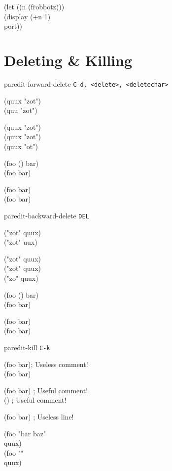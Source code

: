 \documentclass[landscape,a3paper]{article}
\newenvironment{nstabbing}
  {\setlength{\topsep}{-\parskip}%
   \setlength{\partopsep}{0.2em}%
   \tabbing}
  {\endtabbing}
\begin{document}
\begin{multicols}{4}
\begin{nstabbing}
(\=let ((n (f\=robbotz)))\\
\>\cursor (display (+n 1)\\
\>\>
port))
\end{nstabbing}
\rmfamily

    \section*{Deleting \& Killing}

paredit-forward-delete \texttt{C-d, <delete>, <deletechar>}

\ttfamily
(quu\cursor{}x "zot")\\
(quu\cursor{} "zot")

(quux \cursor"zot")\\
(quux "\cursor zot")\\
(quux "\cursor ot")

(foo (\cursor) bar)\\
(foo \cursor{} bar)

\cursor(foo bar)\\
(\cursor foo bar)
\rmfamily

paredit-backward-delete \texttt{DEL}

\ttfamily
("zot" q\cursor uux)\\
("zot" \cursor uux)

("zot"\cursor{} quux)\\
("zot\cursor" quux)\\
("zo\cursor" quux)

(foo (\cursor) bar)\\
(foo \cursor{} bar)

(foo bar)\cursor\\
(foo bar\cursor)
\rmfamily

paredit-kill \texttt{C-k}

\ttfamily
(foo bar)\cursor \space \space \space ; Useless comment!\\
(foo bar)\cursor

(\cursor foo bar) \space \space \space ; Useful comment!\\
(\cursor) \space \space \space ; Useful comment!

\cursor(foo bar) \space \space \space ; Useless line!\\
\cursor

\begin{nstabbing}
(f\=oo "\cursor bar baz"\\
\>quux)\\
(foo "\cursor"\\
\>quux)
\end{nstabbing}
\rmfamily


\end{multicols}
\end{document}
